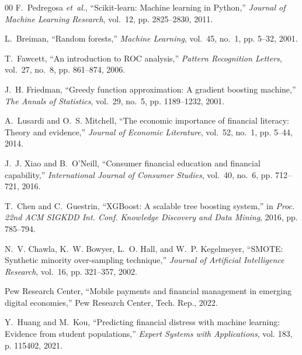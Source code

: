 \documentclass[conference]{IEEEtran}
\begin{document}
\begin{thebibliography}{00}
F.~Pedregosa \emph{et~al.}, ``Scikit-learn: Machine learning in Python,'' \emph{Journal of Machine Learning Research}, vol.~12, pp. 2825--2830, 2011.

L.~Breiman, ``Random forests,'' \emph{Machine Learning}, vol.~45, no.~1, pp. 5--32, 2001.

T.~Fawcett, ``An introduction to ROC analysis,'' \emph{Pattern Recognition Letters}, vol.~27, no.~8, pp. 861--874, 2006.

J.~H. Friedman, ``Greedy function approximation: A gradient boosting machine,'' \emph{The Annals of Statistics}, vol.~29, no.~5, pp. 1189--1232, 2001.

A.~Lusardi and O.~S. Mitchell, ``The economic importance of financial literacy: Theory and evidence,'' \emph{Journal of Economic Literature}, vol.~52, no.~1, pp. 5--44, 2014.

J.~J. Xiao and B.~O'Neill, ``Consumer financial education and financial capability,'' \emph{International Journal of Consumer Studies}, vol.~40, no.~6, pp. 712--721, 2016.

T.~Chen and C.~Guestrin, ``XGBoost: A scalable tree boosting system,'' in \emph{Proc. 22nd ACM SIGKDD Int. Conf. Knowledge Discovery and Data Mining}, 2016, pp. 785--794.

N.~V. Chawla, K.~W. Bowyer, L.~O. Hall, and W.~P. Kegelmeyer, ``SMOTE: Synthetic minority over-sampling technique,'' \emph{Journal of Artificial Intelligence Research}, vol.~16, pp. 321--357, 2002.

Pew Research Center, ``Mobile payments and financial management in emerging digital economies,'' Pew Research Center, Tech. Rep., 2022.

Y.~Huang and M.~Kou, ``Predicting financial distress with machine learning: Evidence from student populations,'' \emph{Expert Systems with Applications}, vol. 183, p. 115402, 2021.

\end{thebibliography}
\end{document}
